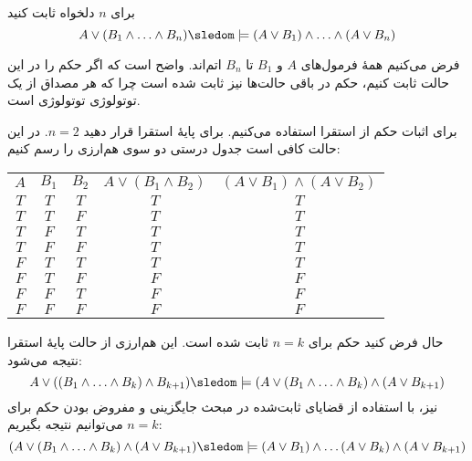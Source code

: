 برای $n$ دلخواه ثابت کنید
$$
A\vee (B_1\wedge\ldots\wedge B_n)\sledom\models(A\vee B_1)\wedge\ldots\wedge(A\vee B_n)
$$
\begin{ans}
فرض می‌کنیم همهٔ فرمول‌های $A$ و $B_1$ تا $B_n$ اتم‌اند. واضح است که اگر حکم را در این حالت ثابت کنیم، حکم در باقی حالت‌ها نیز ثابت شده است چرا که هر مصداق از یک توتولوژی توتولوژی است.

برای اثبات حکم از استقرا استفاده می‌کنیم. برای پایهٔ استقرا قرار دهید $n=2$. در این حالت کافی است جدول درستی دو سوی هم‌ارزی را رسم کنیم:

\begin{tabular}{c|c|c|c|c}
$A$ & $B_1$ & $B_2$ & $A\vee(B_1\wedge B_2)$ & $(A\vee B_1)\wedge(A\vee B_2)$ \\
$T$ & $T$ & $T$ & $T$ & $T$ \\
$T$ & $T$ & $F$ & $T$ & $T$ \\
$T$ & $F$ & $T$ & $T$ & $T$ \\
$T$ & $F$ & $F$ & $T$ & $T$ \\
$F$ & $T$ & $T$ & $T$ & $T$ \\
$F$ & $T$ & $F$ & $F$ & $F$ \\
$F$ & $F$ & $T$ & $F$ & $F$ \\
$F$ & $F$ & $F$ & $F$ & $F$ \\
\end{tabular}

حال فرض کنید حکم برای $n=k$ ثابت شده است. این هم‌ارزی از حالت پایهٔ استقرا نتیجه می‌شود:
$$
A\vee ((B_1\wedge\ldots\wedge B_k)\wedge B_{k+1})\sledom\models (A\vee (B_1\wedge\ldots\wedge B_k)\wedge (A\vee B_{k+1})
$$
نیز، با استفاده از قضایای ثابت‌شده در مبحث جایگزینی و مفروض بودن حکم برای $n=k$ می‌توانیم نتیجه بگیریم:
$$
(A\vee (B_1\wedge\ldots\wedge B_k)\wedge (A\vee B_{k+1})\sledom\models(A\vee B_1)\wedge\ldots(A\vee B_k)\wedge(A\vee B_{k+1})
$$

\end{ans}
